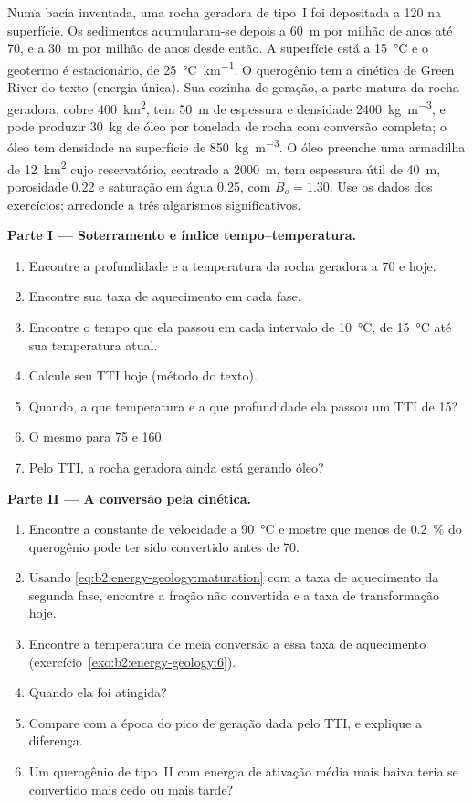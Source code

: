 \begin{problem}\label{pb:b2:energy-geology:1}
Numa bacia inventada, uma rocha geradora de tipo~I foi depositada a \qty{120}{\Ma} na superfície.
Os sedimentos acumularam-se depois a \qty{60}{m} por milhão de anos até \qty{70}{\Ma}, e a \qty{30}{m}
por milhão de anos desde então. A superfície está a \qty{15}{\celsius} e o geotermo é estacionário, de
\qty{25}{\celsius\per\km}. O querogênio tem a cinética de Green River do texto (energia única).
Sua cozinha de geração, a parte matura da rocha geradora, cobre \qty{400}{km^2}, tem \qty{50}{m} de espessura e
densidade \qty{2400}{kg.m^{-3}}, e pode produzir \qty{30}{kg} de óleo por tonelada de rocha com
conversão completa; o óleo tem densidade na superfície de \qty{850}{kg.m^{-3}}. O óleo preenche uma armadilha de
\qty{12}{km^2} cujo reservatório, centrado a \qty{2000}{m}, tem espessura útil de \qty{40}{m},
porosidade 0.22 e saturação em água 0.25, com $B_o = 1.30$. Use os dados dos exercícios; arredonde a
três algarismos significativos.

\noindent\textbf{Parte I --- Soterramento e índice tempo--temperatura.}
\begin{enumerate}
  \item Encontre a profundidade e a temperatura da rocha geradora a \qty{70}{\Ma} e hoje.
  \item Encontre sua taxa de aquecimento em cada fase.
  \item Encontre o tempo que ela passou em cada intervalo de \qty{10}{\celsius}, de \qty{15}{\celsius} até
        sua temperatura atual.
  \item Calcule seu TTI hoje (método do texto).
  \item Quando, a que temperatura e a que profundidade ela passou um TTI de 15?
  \item O mesmo para 75 e 160.
  \item Pelo TTI, a rocha geradora ainda está gerando óleo?
\end{enumerate}

\noindent\textbf{Parte II --- A conversão pela cinética.}
\begin{enumerate}[resume]
  \item Encontre a constante de velocidade a \qty{90}{\celsius} e mostre que menos de \qty{0.2}{\percent} do
        querogênio pode ter sido convertido antes de \qty{70}{\Ma}.
  \item Usando \eqref{eq:b2:energy-geology:maturation} com a taxa de aquecimento da segunda fase,
        encontre a fração não convertida e a taxa de transformação hoje.
  \item Encontre a temperatura de meia conversão a essa taxa de aquecimento (exercício~\ref{exo:b2:energy-geology:6}).
  \item Quando ela foi atingida?
  \item Compare com a época do pico de geração dada pelo TTI, e explique a diferença.
  \item Um querogênio de tipo~II com energia de ativação média mais baixa teria se convertido mais cedo ou mais tarde?
\end{enumerate}


\end{problem}
